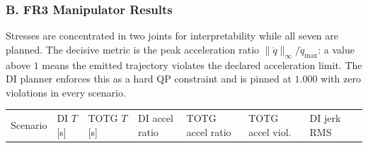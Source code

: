 \subsubsection{B. FR3 Manipulator
Results}\label{b.-fr3-manipulator-results}

Stresses are concentrated in two joints for interpretability while all
seven are planned. The decisive metric is the peak acceleration ratio
\(\lVert\ddot q\rVert_\infty/\ddot q_{\max}\): a value above \(1\) means
the emitted trajectory violates the declared acceleration limit. The DI
planner enforces this as a hard QP constraint and is pinned at \(1.000\)
with zero violations in every scenario.

{\def\LTcaptype{none} %
\begin{longtable}[]{@{}
  >{\raggedright\arraybackslash}p{}
  >{\raggedright\arraybackslash}p{}
  >{\raggedright\arraybackslash}p{}
  >{\raggedright\arraybackslash}p{}
  >{\raggedright\arraybackslash}p{}
  >{\raggedright\arraybackslash}p{}
  >{\raggedright\arraybackslash}p{}
  >{\raggedright\arraybackslash}p{}@{}}
\toprule\noalign{}
\begin{minipage}[b]{\linewidth}\raggedright
Scenario
\end{minipage} & \begin{minipage}[b]{\linewidth}\raggedright
DI \(T\) {[}s{]}
\end{minipage} & \begin{minipage}[b]{\linewidth}\raggedright
TOTG \(T\) {[}s{]}
\end{minipage} & \begin{minipage}[b]{\linewidth}\raggedright
DI accel ratio
\end{minipage} & \begin{minipage}[b]{\linewidth}\raggedright
TOTG accel ratio
\end{minipage} & \begin{minipage}[b]{\linewidth}\raggedright
TOTG accel viol.
\end{minipage} & \begin{minipage}[b]{\linewidth}\raggedright
DI jerk RMS
\end{minipage} & \begin{minipage}[b]{\linewidth}\raggedright

\end{minipage}
\end{longtable}}
